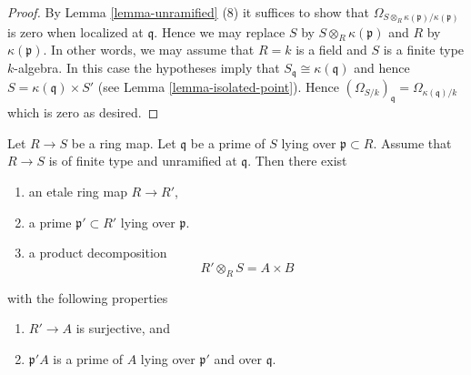 \begin{proof}
By Lemma \ref{lemma-unramified} (8) it suffices to show that
$\Omega_{S \otimes_R \kappa(\mathfrak p) / \kappa(\mathfrak p)}$
is zero when localized at $\mathfrak q$. Hence we may replace $S$
by $S \otimes_R \kappa(\mathfrak p)$ and $R$ by $\kappa(\mathfrak p)$.
In other words, we may assume that $R = k$ is a field and $S$
is a finite type $k$-algebra.
In this case the hypotheses imply that
$S_{\mathfrak q} \cong \kappa(\mathfrak q)$
and hence $S = \kappa(\mathfrak q) \times S'$ (see
Lemma \ref{lemma-isolated-point}).
Hence $(\Omega_{S/k})_{\mathfrak q} = \Omega_{\kappa(\mathfrak q)/k}$
which is zero as desired.
\end{proof}







\begin{lemma}
\label{lemma-etale-makes-unramfied-closed-at-prime}
Let $R \to S$ be a ring map.
Let $\mathfrak q$ be a prime of $S$ lying over $\mathfrak p \subset R$.
Assume that $R \to S$ is of finite type and unramified at $\mathfrak q$.
Then there exist
\begin{enumerate}
\item an etale ring map $R \to R'$,
\item a prime $\mathfrak p' \subset R'$ lying over $\mathfrak p$.
\item a product decomposition
$$
R' \otimes_R S = A \times B
$$
\end{enumerate}
with the following properties
\begin{enumerate}
\item $R' \to A$ is surjective, and
\item $\mathfrak p'A$ is a prime of $A$ lying over $\mathfrak p'$ and
over $\mathfrak q$.
\end{enumerate}
\end{lemma}

